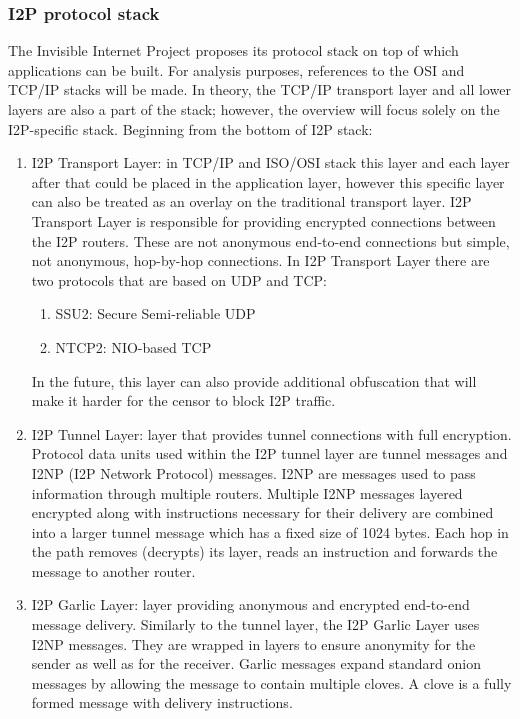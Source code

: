 \subsubsection{I2P protocol stack}
The Invisible Internet Project proposes its protocol stack on top of which applications can be built. For analysis purposes, references to the OSI and TCP/IP stacks will be made. In theory, the TCP/IP transport layer and all lower layers are also a part of the stack; however, the overview will focus solely on the I2P-specific stack. Beginning from the bottom of I2P stack:
\begin{enumerate}
    \item I2P Transport Layer: in TCP/IP and ISO/OSI stack this layer and each layer after that could be placed in the application layer, however this specific layer can also be treated as an overlay on the traditional transport layer. I2P Transport Layer is responsible for providing encrypted connections between the I2P routers. These are not anonymous end-to-end connections but simple, not anonymous, hop-by-hop connections. In I2P Transport Layer there are two protocols that are based on UDP and TCP:
    \begin{enumerate}
        \item SSU2: Secure Semi-reliable UDP
        \item NTCP2: NIO-based TCP
    \end{enumerate}
In the future, this layer can also provide additional obfuscation that will make it harder for the censor to block I2P traffic.
    \item I2P Tunnel Layer: layer that provides tunnel connections with full encryption. Protocol data units used within the I2P tunnel layer are tunnel messages and I2NP (I2P Network Protocol) messages. I2NP are messages used to pass information through multiple routers. Multiple I2NP messages layered encrypted along with instructions necessary for their delivery are combined into a larger tunnel message which has a fixed size of 1024 bytes. Each hop in the path removes (decrypts) its layer, reads an instruction and forwards the message to another router.
    \item I2P Garlic Layer: layer providing anonymous and encrypted end-to-end message delivery.
    Similarly to the tunnel layer, the I2P Garlic Layer uses I2NP messages. They are wrapped in layers to ensure anonymity for the sender as well as for the receiver. Garlic messages expand standard onion messages by allowing the message to contain multiple cloves. A clove is a fully formed message with delivery instructions.
\end{enumerate}
